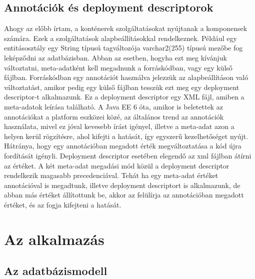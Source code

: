 \documentclass[centeredchapter]{thesis-ekf}
\theoremstyle{definition}
\theoremstyle{remark}
\begin{document}
\section{Annotációk és deployment descriptorok}

Ahogy az előbb írtam, a konténerek szolgáltatásokat nyújtanak a komponensek számára. Ezek a szolgáltatások alapbeállításokkal rendelkeznek. Például egy entitásosztály egy String típusú tagváltozója varchar2(255) típusú mezőbe fog leképződni az adatbázisban. Abban az esetben, hogyha ezt meg kívánjuk változtatni, meta-adatként kell megadnunk a forráskódban, vagy egy külső fájlban. Forráskódban egy annotációt használva jelezzük az alapbeállításon való változtatást, amikor pedig egy külső fájlban tesszük ezt meg egy deployment descriptor-t alkalmazunk. Ez a deployment descriptor egy XML fájl, amiben a meta-adatok leírása található. A Java EE 6 óta, amikor is beletettek az annotációkat a platform eszközei közé, az általános trend az annotációk használata, mivel ez jóval kevesebb írást igényel, illetve a meta-adat azon a helyen kerül rögzítésre, ahol kifejti a hatását, így egyszerű kezelhetőséget nyújt. Hátránya, hogy egy annotációban megadott érték megváltoztatása a kód újra fordítását igényli. Deployment descriptor esetében elegendő az xml fájlban átírni az értéket.
A két meta-adat megadási mód közül a deployment descriptor rendelkezik magasabb precedenciával. Tehát ha egy meta-adat értéket annotációval is megadtunk, illetve deployment descriptort is alkalmazunk, de abban más értéket állítottunk be, akkor az felülírja az annotációban megadott értéket, és az fogja kifejteni a hatását.

\chapter{Az alkalmazás}

\section{Az adatbázismodell}
\end{document}
